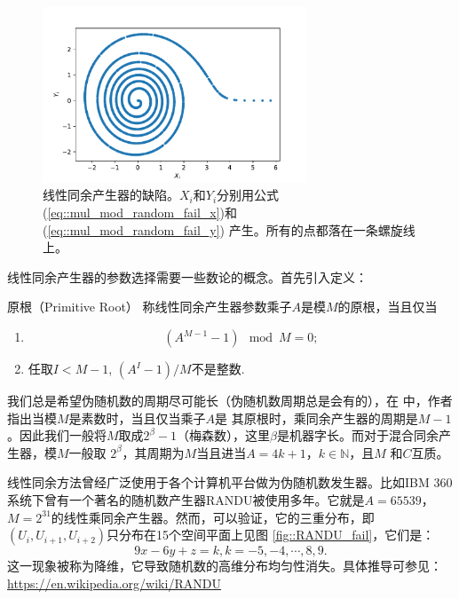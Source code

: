 \begin{figure}[!ht]
\centering
\includegraphics[width=0.7\textwidth]{images/mul_mod_random_fail.pdf}
\caption{线性同余产生器的缺陷。$X_i$和$Y_i$分别用公式
  (\ref{eq::mul_mod_random_fail_x})和(\ref{eq::mul_mod_random_fail_y})
  产生。所有的点都落在一条螺旋线上。}
\label{fig::mul_mod_random_fail}
\end{figure}

线性同余产生器的参数选择需要一些数论的概念。首先引入定义：

\begin{definition} {\hei 原根（Primitive Root）}
  称线性同余产生器参数乘子$A$是模$M$的原根，当且仅当
  \begin{enumerate}
    \item 
      \begin{equation}
        (A^{M - 1} - 1) \mod M  = 0;
        \label{eq::primitive_root}
      \end{equation}
    \item 任取$I < M - 1$, $(A^I - 1) / M$不是整数.
  \end{enumerate}
  \label{def::primitive_root}
\end{definition}

我们总是希望伪随机数的周期尽可能长（伪随机数周期总是会有的），在
\cite{Fishman1995Monte}中，作者指出当模$M$是素数时，当且仅当乘子$A$是
其原根时，乘同余产生器的周期是$M - 1$。因此我们一般将$M$取成$2^\beta -
1$（梅森数），这里$\beta$是机器字长。而对于混合同余产生器，模$M$一般取
$2^\beta$，其周期为$M$当且进当$A = 4k + 1$，$k \in \mathbb{N}$，且$M$
和$C$互质。

线性同余方法曾经广泛使用于各个计算机平台做为伪随机数发生器。比如IBM
360系统下曾有一个著名的随机数产生器RANDU被使用多年。它就是$A = 65539$，
$M = 2^{31}$的线性乘同余产生器。然而，可以验证，它的三重分布，即
$(U_{i}, U_{i + 1}, U_{i + 2})$只分布在15个空间平面上见图
\ref{fig::RANDU_fail}，它们是：
\begin{equation}
  9x - 6y + z = k, k = -5, -4, \cdots, 8, 9.
\label{eq::RANDU_plain}  
\end{equation}
这一现象被称为降维，它导致随机数的高维分布均匀性消失。具体推导可参见：\\
\href{https://en.wikipedia.org/wiki/RANDU}{https://en.wikipedia.org/wiki/RANDU} \\

